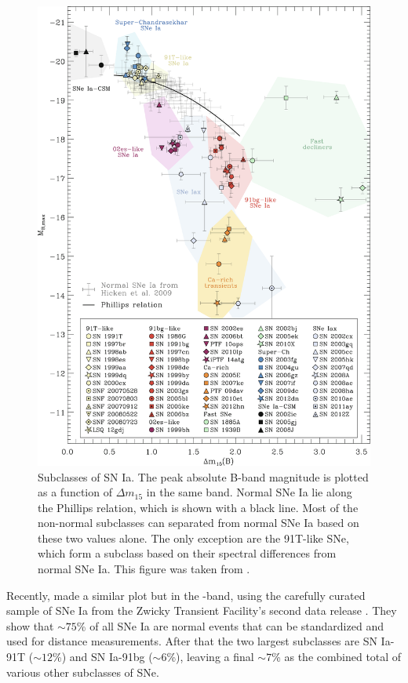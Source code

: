 \documentclass[a4paper,oneside,12pt, class=Latex/Classes/PhDthesisPSnPDF, crop=false]{standalone}
\begin{document}
\begin{figure}
    \centering
    \includegraphics[width=\textwidth]{../Images/chapter_1/Taub_plot.png}
    \caption{Subclasses of SN Ia. The peak absolute B-band magnitude is plotted as a function of $\Delta m_{15}$ in the same band. Normal SNe Ia lie along the Phillips relation, which is shown with a black line. Most of the non-normal subclasses can separated from normal SNe Ia based on these two values alone. The only exception are the 91T-like SNe, which form a subclass based on their spectral differences from normal SNe Ia. This figure was taken from \citet{Taubenberger_plot}.}
    \label{Taub_plot}
\end{figure}

Recently, \citet{DR2_diversity} made a similar plot but in the \ztfg-band, using the carefully curated sample of SNe Ia from the Zwicky Transient Facility's second data release \citep[ZTF SN Ia DR2,][Smith et al., in prep.]{DR2_Overview}. They show that $\sim75$\% of all SNe Ia are normal events that can be standardized and used for distance measurements. After that the two largest subclasses are SN Ia-91T ($\sim12$\%) and SN Ia-91bg ($\sim6$\%), leaving a final $\sim7$\% as the combined total of various other subclasses of SNe.
\end{document}
